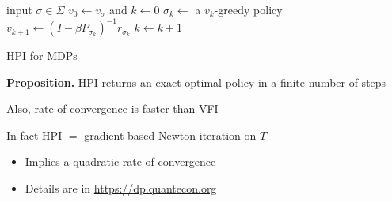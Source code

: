 \documentclass[xcolor=dvipsnames]{beamer}
\newcommand{\1}{\mathbbm 1}
\begin{document}
\begin{frame}
        
    {\small
    \begin{algorithm}[H]
        \DontPrintSemicolon
        \vspace{0.3em}
        input $\sigma \in \Sigma$ \;
    \vspace{0.3em}
        $v_0 \leftarrow v_\sigma$ and $k \leftarrow 0$  \;
    \vspace{0.3em}
        \Repeat
        {
            $\sigma_k \leftarrow $ a $v_k$-greedy policy \;
    \vspace{0.3em}
            $v_{k+1} \leftarrow (I - \beta P_{\sigma_k} )^{-1} r_{\sigma_k}$ \;
    \vspace{0.3em}
    \vspace{0.3em}
            $k \leftarrow k + 1$ \;
    \vspace{0.3em}
        }
    \vspace{0.3em}
        \caption{HPI for MDPs}
    \end{algorithm}
    }

\end{frame}

\begin{frame}
    
    \begin{block}{}
        {\bf Proposition.} 
            HPI returns an exact optimal policy in a finite number of steps
    \end{block}

    \vspace{0.5em}
    \vspace{0.5em}
    \vspace{0.5em}

    Also, rate of convergence is faster than VFI 

    \vspace{0.5em}
    \vspace{0.5em}

    In fact HPI $=$ gradient-based Newton iteration on $T$
    \vspace{0.5em}

    \begin{itemize}
        \item Implies a quadratic rate of convergence
        \vspace{0.5em}
        \item Details are in \url{https://dp.quantecon.org}
    \end{itemize}


\end{frame}
\end{document}
